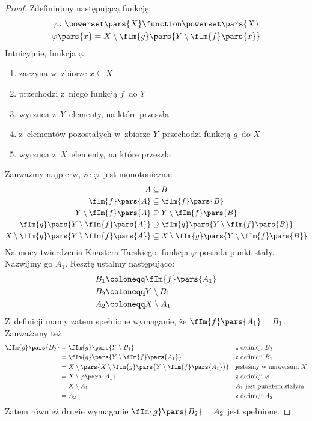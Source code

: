 \begin{proof}
Zdefiniujmy następującą funkcję:
\begin{gather*}
    \varphi\colon \powerset\pars{X} \function \powerset\pars{X}\\
    \varphi\pars{x} = X \setminus \fIm{g}\pars{Y \setminus \fIm{f}\pars{x}}
\end{gather*}
Intuicyjnie, funkcja \(\varphi\)
\begin{enumerate}
    \item zaczyna w~zbiorze \(x \subseteq X\)
    \item przechodzi z~niego funkcją \(f\)~do \(Y\)
    \item wyrzuca z~\(Y\)~elementy, na które przeszła
    \item z~elementów pozostałych w~zbiorze \(Y\)~przechodzi funkcją \(g\)~do \(X\)
    \item wyrzuca z~\(X\)~elementy, na które przeszła
\end{enumerate}
Zauważmy najpierw, że \(\varphi\)~jest monotoniczna:
\begin{align*}
    A &\subseteq B\\
    \fIm{f}\pars{A} &\subseteq \fIm{f}\pars{B}\\
    Y \setminus \fIm{f}\pars{A} &\supseteq Y \setminus \fIm{f}\pars{B}\\
    \fIm{g}\pars{Y \setminus \fIm{f}\pars{A}} &\supseteq \fIm{g}\pars{Y \setminus \fIm{f}\pars{B}}\\
    X \setminus \fIm{g}\pars{Y \setminus \fIm{f}\pars{A}} &\subseteq X \setminus \fIm{g}\pars{Y \setminus \fIm{f}\pars{B}}
\end{align*}
Na mocy twierdzenia Knastera-Tarskiego, funkcja \(\varphi\) posiada punkt stały. Nazwijmy go \(A_1\). Resztę ustalmy następująco:
\begin{align*}
    B_1 &\coloneqq \fIm{f}\pars{A_1}\\
    B_2 &\coloneqq Y \setminus B_1\\
    A_2 &\coloneqq X \setminus A_1
\end{align*}
Z~definicji mamy zatem spełnione wymaganie, że \(\fIm{f}\pars{A_1} = B_1\). Zauważamy też
\begin{align*}
    \fIm{g}\pars{B_2}
        &= \fIm{g}\pars{Y \setminus B_1} && \text{z~definicji \(B_2\)}\\
        &= \fIm{g}\pars{Y \setminus \fIm{f}\pars{A_1}} && \text{z~definicji \(B_1\)}\\
        &= X \setminus \pars{X \setminus \fIm{g}\pars{Y \setminus \fIm{f}\pars{A_1}}} && \text{jesteśmy w~uniwersum \(X\)}\\
        &= X \setminus \varphi\pars{A_1} && \text{z~definicji \(\varphi\)}\\
        &= X \setminus A_1 && \text{\(A_1\)~jest punktem stałym}\\
        &= A_2 && \text{z~definicji \(A_2\)}
\end{align*}
Zatem również drugie wymaganie \(\fIm{g}\pars{B_2} = A_2\) jest spełnione.
\end{proof}

